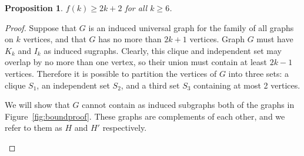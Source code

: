 \documentclass[12pt]{article}
\newtheorem{proposition}{Proposition}
\begin{document}
\begin{proposition}\label{f6proposition}
    $f(k) \geq 2k + 2$ for all $k \geq 6$.
\end{proposition}
\begin{proof}

    Suppose that $G$ is an induced universal graph for the family of all graphs
    on $k$ vertices, and that $G$ has no more than $2k + 1$ vertices.  Graph
    $G$ must have $K_k$ and $I_k$ as induced sugraphs.  Clearly, this clique and
    independent set may overlap by no more than one vertex, so their union must
    contain at least $2k - 1$ vertices.  Therefore it is possible to partition
    the vertices of $G$ into three sets: a clique $S_1$, an independent set
    $S_2$, and a third set $S_3$ containing at most 2 vertices.

    We will show that $G$ cannot contain as induced subgraphs both
    of the graphs in Figure~\ref{fig:boundproof}.  These graphs are complements
    of each other, and we refer to them as $H$ and $H'$ respectively.

\begin{figure}[htb]
    \centering


\end{figure}
\end{proof}
\end{document}
